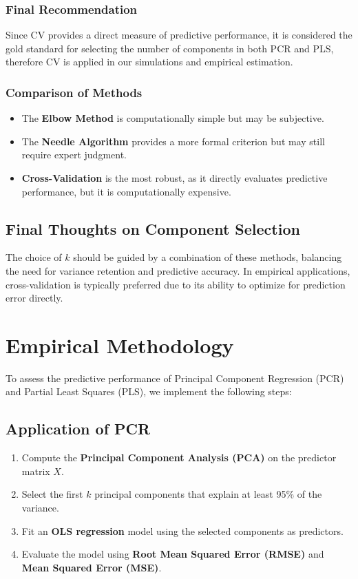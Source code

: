 \documentclass[11pt,twoside,a4paper]{article}
\begin{document}
\subsubsection{Final Recommendation}
Since CV provides a direct measure of predictive performance, it is considered the gold standard for selecting the number of components in both PCR and PLS, therefore CV is applied in our simulations and empirical estimation.

\subsubsection{Comparison of Methods}
\begin{itemize}
    \item The \textbf{Elbow Method} is computationally simple but may be subjective.
    \item The \textbf{Needle Algorithm} provides a more formal criterion but may still require expert judgment.
    \item \textbf{Cross-Validation} is the most robust, as it directly evaluates predictive performance, but it is computationally expensive.
\end{itemize}

\subsection{Final Thoughts on Component Selection}
The choice of \( k \) should be guided by a combination of these methods, balancing the need for variance retention and predictive accuracy. In empirical applications, cross-validation is typically preferred due to its ability to optimize for prediction error directly.

\section{Empirical Methodology}

To assess the predictive performance of Principal Component Regression (PCR) and Partial Least Squares (PLS), we implement the following steps:

\subsection{Application of PCR}
\begin{enumerate}
    \item Compute the \textbf{Principal Component Analysis (PCA)} on the predictor matrix \(X\).
    \item Select the first \(k\) principal components that explain at least 95\% of the variance.
    \item Fit an \textbf{OLS regression} model using the selected components as predictors.
    \item Evaluate the model using \textbf{Root Mean Squared Error (RMSE)} and \textbf{Mean Squared Error (MSE)}.
\end{enumerate}
\end{document}
